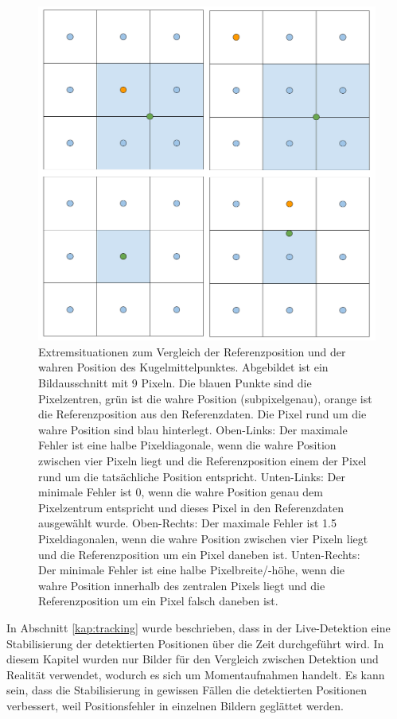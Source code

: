 \begin{figure}[h!]
    \begin{center}
        \includegraphics[width=0.5\linewidth]{../common/04_results/resources/detektion_min_und_max_fehler.png}
    \end{center}
    \caption{
        Extremsituationen zum Vergleich der Referenzposition und der wahren Position des Kugelmittelpunktes.
        Abgebildet ist ein Bildausschnitt mit 9 Pixeln. Die blauen Punkte sind die Pixelzentren, grün ist die wahre Position (subpixelgenau), orange ist die Referenzposition aus den Referenzdaten.
        Die Pixel rund um die wahre Position sind blau hinterlegt.
        Oben-Links: Der maximale Fehler ist eine halbe Pixeldiagonale, wenn die wahre Position zwischen vier Pixeln liegt und die Referenzposition einem der Pixel rund um die tatsächliche Position entspricht.
        Unten-Links: Der minimale Fehler ist $0$, wenn die wahre Position genau dem Pixelzentrum entspricht und dieses Pixel in den Referenzdaten ausgewählt wurde.
        Oben-Rechts: Der maximale Fehler ist 1.5 Pixeldiagonalen, wenn die wahre Position zwischen vier Pixeln liegt und die Referenzposition um ein Pixel daneben ist.
        Unten-Rechts: Der minimale Fehler ist eine halbe Pixelbreite/-höhe, wenn die wahre Position innerhalb des zentralen Pixels liegt und die Referenzposition um ein Pixel falsch daneben ist.
    }
    \label{fig:detektion_resultate_min_max_fehler_referenzdaten}
\end{figure}

In Abschnitt \ref{kap:tracking} wurde beschrieben, dass in der Live-Detektion eine Stabilisierung der detektierten Positionen
über die Zeit durchgeführt wird.
In diesem Kapitel wurden nur Bilder für den Vergleich zwischen Detektion und Realität verwendet, wodurch es sich um Momentaufnahmen handelt.
Es kann sein, dass die Stabilisierung in gewissen Fällen die detektierten Positionen verbessert,
weil Positionsfehler in einzelnen Bildern geglättet werden.

